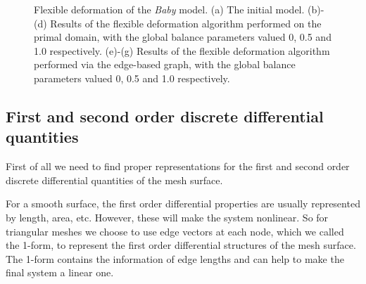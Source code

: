 \begin{figure} [htbp]
{\begin{minipage}[b]{0.3\textwidth}
    \end{minipage}}
  \caption{Flexible deformation of the \textit{Baby} model. (a) The initial model. (b)-(d) Results of the flexible deformation algorithm performed on the primal domain, with the global balance parameters valued 0, 0.5 and 1.0 respectively. (e)-(g) Results of the flexible deformation algorithm performed via the edge-based graph, with the global balance parameters valued 0, 0.5 and 1.0 respectively.}
  \label{fig:deformbaby} %
\end{figure}






\subsection{First and second order discrete differential
quantities} First of all we need to find proper  representations for
the first and second order discrete differential quantities of the
mesh surface.

For a smooth surface, the  first order differential properties are
usually represented by length, area, etc. However, these will make
the system nonlinear. So for triangular meshes we choose to use edge
vectors at each node, which we called the 1-form, to represent the
first order differential structures of the mesh surface. The 1-form
contains the information of edge lengths and can help to make the
final system a linear one.

